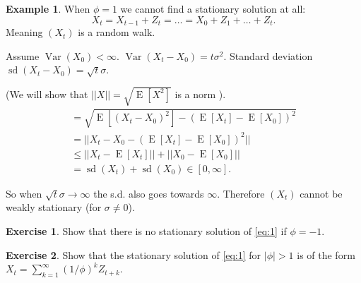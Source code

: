 \documentclass[12pt,a4paper, notitlepage]{book}
\theoremstyle{definition} %
\newtheorem{example}{Example}[chapter]
\newtheorem{exercise}{Exercise}[chapter]
\theoremstyle{plain} %
\DeclareMathOperator{\Var}{Var}
\DeclareMathOperator{\E}{E}
\DeclareMathOperator{\Sd}{sd}
\begin{document}
\begin{example}
When $\phi = 1$ we cannot find a stationary solution at all:
\[X_t = X_{t-1} + Z_t = \dots = X_0 + Z_1 + \dots + Z_t. \]
 Meaning $(X_t)$ is a random walk. 

Assume $\Var(X_0) < \infty$. $\Var(X_t - X_0) = t \sigma^2$. 
Standard deviation $ \Sd(X_t - X_0) = \sqrt{t} \sigma$.

(We will show that $|| X || = \sqrt{ \E[X^2]}$ is a norm ).
\begin{align*} 
= \sqrt{\E \left[ (X_t - X_0)^2\right]  - \left(\E[X_t] - \E[X_0]\right)^2} \\ 
= || X_t - X_0 - (\E[X_t] - \E[X_0])^2 ||  
\\ \leq || X_t - \E [X_t]  || + || X_0 - \E[X_0]|| 
\\ =  \Sd(X_t) + \Sd(X_0) \in [0, \infty] . \end{align*}

So when $\sqrt{t}\sigma \rightarrow \infty$ the s.d. also goes towards $\infty$. Therefore $(X_t)$ cannot be weakly stationary (for $\sigma \neq 0$). 
\end{example}



\begin{exercise}
Show that there is no stationary solution of 
\ref{eq:1} 
 if $\phi = -1$.
\end{exercise}

\begin{exercise}
Show that the stationary solution of 
\ref{eq:1}  for $|\phi| > 1 $ is of the form 
$X_t = \sum_{k = 1}^\infty (1/\phi)^k Z_{t + k}$.
\end{exercise}
\end{document}
